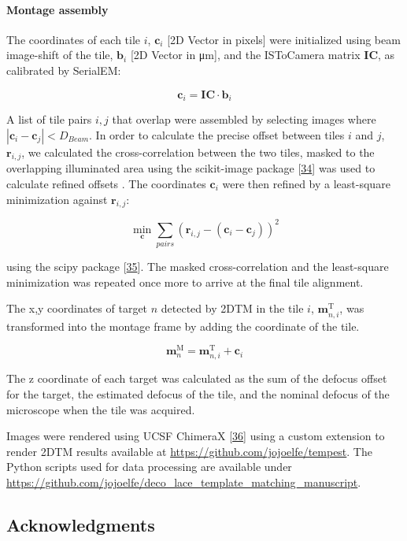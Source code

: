 \documentclass[
]{article}
\begin{document}
\hypertarget{montage-assembly}{%
\paragraph{Montage assembly}\label{montage-assembly}}

The coordinates of each tile \(i\),
\(\mathbf{c}_{i}\) {[}2D Vector in pixels{]} were initialized using beam image-shift of the tile, \(\mathbf{b}_i\) {[}2D Vector in μm{]},
and the ISToCamera matrix \(\mathbf{IC}\), as calibrated by SerialEM:

\[\mathbf{c}_{i} = \mathbf{IC} \cdot \mathbf{b}_i\]

A list of tile pairs \(i,j\) that overlap were assembled by selecting images where
\(|\mathbf{c}_i-\mathbf{c}_j| < D_{Beam}\). In order to calculate the precise offset between tiles \(i\) and \(j\), \(\mathbf{r}_{i,j}\), we calculated the cross-correlation between the two tiles, masked to the overlapping illuminated area using the scikit-image
package {[}\protect\hyperlink{ref-stvWEJeu}{34}{]} was used to calculate refined offsets . The coordinates \(\mathbf{c}_{i}\) were then refined by a least-square minimization against \(\mathbf{r}_{i,j}\):

\[ \displaystyle{\min_{\mathbf{c}} \sum_{pairs}{(\mathbf{r}_{i,j} - (\mathbf{c}_i-\mathbf{c}_j))^2}}\]

using the scipy package {[}\protect\hyperlink{ref-8Miti2Gz}{35}{]}. The masked cross-correlation and the least-square minimization was repeated once more to arrive at the final tile alignment.

The x,y coordinates of target \(n\) detected by 2DTM in the tile \(i\),
\(\textbf{m}^\textrm{T}_{n,i}\), was transformed into the montage frame by adding
the coordinate of the tile.

\[ \textbf{m}^\textrm{M}_n = \textbf{m}^\textrm{T}_{n,i} + \textbf{c}_i\]

The z coordinate of each target was calculated as the sum of the defocus offset
for the target, the estimated defocus of the tile, and the nominal defocus of
the microscope when the tile was acquired.

Images were rendered using UCSF ChimeraX {[}\protect\hyperlink{ref-cYCuuZxG}{36}{]} using a custom extension to render 2DTM results available at \url{https://github.com/jojoelfe/tempest}. The Python scripts used for data processing are available
under \url{https://github.com/jojoelfe/deco_lace_template_matching_manuscript}.

\hypertarget{acknowledgments}{%
\subsection{Acknowledgments}\label{acknowledgments}}
\end{document}
